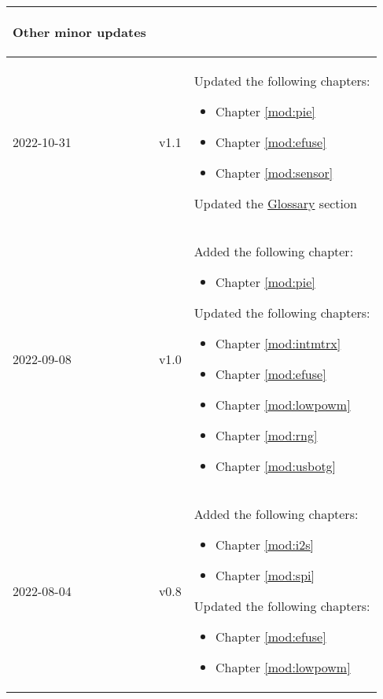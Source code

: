 \begin{longtable}[l]{ | m{2cm} | m{1.5cm} | m{12cm} | }
\begin{itemize}
    \end{itemize}
    Other minor updates
    \\\hline
    2022-10-31         & v1.1  &
    Updated the following chapters:
    \begin{itemize}
        \item Chapter \ref{mod:pie} \textit{\nameref{mod:pie}}
        \item Chapter \ref{mod:efuse} \textit{\nameref{mod:efuse}}
        \item Chapter \ref{mod:sensor} \textit{\nameref{mod:sensor}}%
    \end{itemize}
    Updated the \hyperref[glossary]{Glossary} section
    \\\hline
    2022-09-08         & v1.0  &
    Added the following chapter:
    \begin{itemize}
        \item Chapter \ref{mod:pie} \textit{\nameref{mod:pie}}
    \end{itemize}
    Updated the following chapters:
    \begin{itemize}
        \item Chapter \ref{mod:intmtrx} \textit{\nameref{mod:intmtrx}}
        \item Chapter \ref{mod:efuse} \textit{\nameref{mod:efuse}}
        \item Chapter \ref{mod:lowpowm} \textit{\nameref{mod:lowpowm}} %
        \item Chapter \ref{mod:rng} \textit{\nameref{mod:rng}} %
        \item Chapter \ref{mod:usbotg} \textit{\nameref{mod:usbotg}} %
    \end{itemize}
    \\\hline
    2022-08-04     & v0.8  &
    Added the following chapters:
    \begin{itemize}
        \item Chapter \ref{mod:i2s} \textit{\nameref{mod:i2s}}
        \item Chapter \ref{mod:spi} \textit{\nameref{mod:spi}}
    \end{itemize}
    Updated the following chapters:
    \begin{itemize}
        \item Chapter \ref{mod:efuse} \textit{\nameref{mod:efuse}} %
        \item Chapter \ref{mod:lowpowm} \textit{\nameref{mod:lowpowm}} %
    \end{itemize}

\end{longtable}
